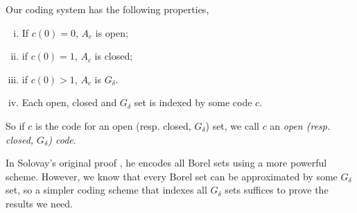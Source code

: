 Our coding system has the following properties,
\begin{enumerate}[i.]
    \item If \(c(0) = 0\), \(A_c\) is open;
    \item if \(c(0) = 1\), \(A_c\) is closed;
    \item if \(c(0) > 1\), \(A_c\) is \(G_\delta\).
    \item Each open, closed and \(G_\delta\) set is indexed by some code \(c\).
\end{enumerate}
So if \(c\) is the code for an open (resp. closed, \(G_\delta\)) set,
we call \(c\) an \emph{open (resp. closed, \(G_\delta\)) code}.

\begin{remark}
    In Solovay's original proof \autocite{solovay1970}, he encodes all Borel sets using a more powerful scheme.
    However, we know that every Borel set can be approximated by some \(G_\delta\) set,
    so a simpler coding scheme that indexes all \(G_\delta\) sets suffices to prove the results we need.
\end{remark}

